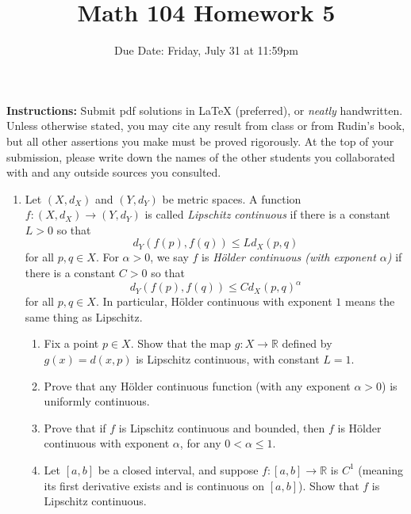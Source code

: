 \documentclass[12pt, letterpaper]{article}
\title{Math 104 Homework 5}
\author{Due Date: Friday, July 31 at 11:59pm}
\date{}
\newcommand{\0}{\mathbf{0}}
\newcommand{\1}{\mathbf{1}}
\begin{document}
\maketitle

\textbf{Instructions:} Submit pdf solutions in LaTeX (preferred), or \textit{neatly} handwritten. Unless otherwise stated, you may cite any result from class or from Rudin's book, but all other assertions you make must be proved rigorously. At the top of your submission, please write down the names of the other students you collaborated with and any outside sources you consulted.

\vspace{0.5cm}

\begin{enumerate}
    \item 
    Let $(X, d_X)$ and $(Y, d_Y)$ be metric spaces. A function $f : (X, d_X) \to (Y, d_Y)$ is called \textit{Lipschitz continuous} if there is a constant $L > 0$ so that
    \begin{equation*}
        d_Y(f(p), f(q)) \leq Ld_X(p, q)
    \end{equation*}
    for all $p, q \in X$. For $\alpha > 0$, we say $f$ is \textit{H\"older continuous (with exponent $\alpha$)} if there is a constant $C > 0$ so that
    \begin{equation*}
        d_Y(f(p), f(q)) \leq C d_X(p, q)^\alpha
    \end{equation*}
    for all $p, q \in X$. In particular, H\"older continuous with exponent $1$ means the same thing as Lipschitz.
    \begin{enumerate}
        \item 
        Fix a point $p \in X$. Show that the map $g : X \to \mathbb{R}$ defined by $g(x) = d(x, p)$ is Lipschitz continuous, with constant $L = 1$.
        
        \item 
        Prove that any H\"older continuous function (with any exponent $\alpha > 0$) is uniformly continuous.

        \item 
        Prove that if $f$ is Lipschitz continuous and bounded, then $f$ is H\"older continuous with exponent $\alpha$, for any $0 < \alpha \leq 1$.

        \item 
        Let $[a, b]$ be a closed interval, and suppose $f : [a, b] \to \mathbb{R}$ is $C^1$ (meaning its first derivative exists and is continuous on $[a, b]$). Show that $f$ is Lipschitz continuous.


\end{enumerate}
\end{enumerate}
\end{document}
